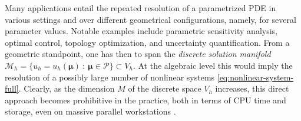\documentclass[12pt, a4paper, twoside, openright, notitlepage]{report}
\numberwithin{equation}{chapter}
\theoremstyle{theorem}
\theoremstyle{definition}
\theoremstyle{remark}
\theoremstyle{proposition}
\numberwithin{figure}{chapter}
\begin{document}
		Many applications entail the repeated resolution of a parametrized PDE in various settings and over different geometrical configurations, namely, for several parameter values. Notable examples include parametric sensitivity analysis, optimal control, topology optimization, and uncertainty quantification. From a geometric standpoint, one has then to span the \emph{discrete solution manifold} $\mathcal{M}_h = \big\lbrace u_h = u_h(\boldsymbol{\mu}) ~ : ~ \boldsymbol{\mu} \in \mathcal{P} \big\rbrace \subset V_h$. At the algebraic level this would imply the resolution of a possibly large number of nonlinear systems \eqref{eq:nonlinear-system-full}. Clearly, as the dimension $M$ of the discrete space $V_h$ increases, this direct approach becomes prohibitive in the practice, both in terms of CPU time and storage, even on massive parallel workstations \cite{QMN15}. 
		
\end{document}
